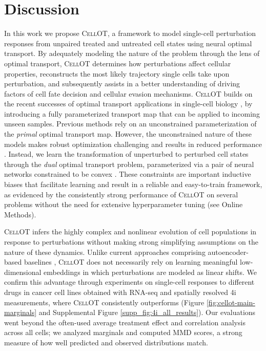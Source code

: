 \section{Discussion}

In this work we propose \textsc{CellOT}, a framework to model single-cell perturbation responses from unpaired treated and untreated cell states using neural optimal transport.
By adequately modeling the nature of the problem through the lens of optimal transport, \textsc{CellOT} determines how perturbations affect cellular properties, reconstructs the most likely trajectory single cells take upon perturbation, and subsequently assists in a better understanding of driving factors of cell fate decision and cellular evasion mechanisms.
\textsc{CellOT} builds on the recent successes of optimal transport applications in single-cell biology \cite{schiebinger2019, lavenant2023}, by introducing a fully parameterized transport map that can be applied to incoming unseen samples.
Previous methods \cite{leygonie2019, yang2019, prasad2022} rely on an unconstrained parameterization of the \emph{primal} optimal transport map. However, the unconstrained nature of these models makes robust optimization challenging and results in reduced performance \cite[Table 1]{makkuva2020}.
Instead, we learn the transformation of unperturbed to perturbed cell states through the \emph{dual} optimal transport problem, parameterized via a pair of neural networks constrained to be convex \cite{makkuva2020}.
These constraints are important inductive biases that facilitate learning and result in a reliable and easy-to-train framework, as evidenced by the consistently strong performance of \textsc{CellOT} on several problems without the need for extensive hyperparameter tuning (see Online Methods).

\textsc{CellOT} infers the highly complex and nonlinear evolution of cell populations in response to perturbations without making strong simplifying assumptions on the nature of these dynamics.
Unlike current approaches comprising autoencoder-based baselines \cite{lopez2018, lotfollahi2019, yang2020}, \textsc{CellOT} does not necessarily rely on learning meaningful low-dimensional embeddings in which perturbations are modeled as linear shifts. %
We confirm this advantage through experiments on single-cell responses to different drugs in cancer cell lines obtained with RNA-seq and spatially resolved 4i measurements, where \textsc{CellOT} consistently outperforms (Figure \ref{fig:cellot-main-marginals} and Supplemental Figure \ref{supp_fig:4i_all_results}). Our evaluations went beyond the often-used average treatment effect and correlation analysis across all cells; we analyzed marginals
and computed MMD scores, a strong measure of how well predicted and observed distributions match.

